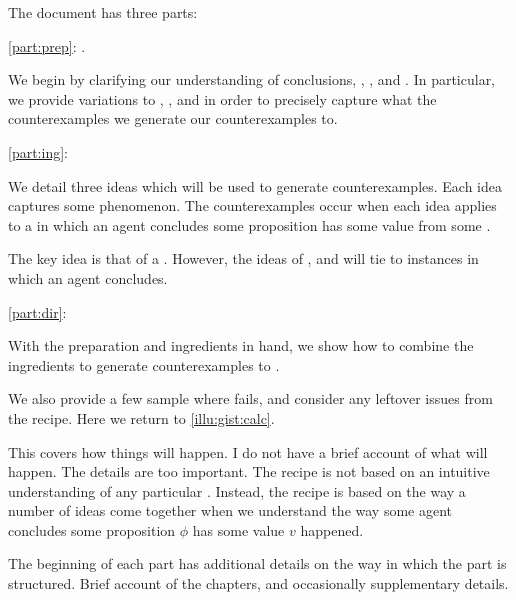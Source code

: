 \begin{note}
  The document has three parts:

  \begin{TOCEnum}
  \item
    \autoref{part:prep}: .

    We begin by clarifying our understanding of conclusions, \qWhy{}, \qHow{}, and \issueInclusion{}.
    In particular, we provide variations to \qWhy{}, \qHow{}, and \issueInclusion{} in order to precisely capture what the counterexamples we generate our counterexamples to.
  \item
    \autoref{part:ing}: 

    We detail three ideas which will be used to generate counterexamples.
    Each idea captures some phenomenon.
    The counterexamples occur when each idea applies to a  in which an agent concludes some proposition has some value from some \pool{}.

    The key idea is that of a \fc{}.
    However, the ideas of \tC{}, and \requ{} will tie  to instances in which an agent concludes.
  \item
    \autoref{part:dir}: 

    With the preparation and ingredients in hand, we show how to combine the ingredients to generate counterexamples to \issueInclusion{}.

    We also provide a few sample  where \issueInclusion{} fails, and consider any leftover issues from the recipe.
    Here we return to \autoref{illu:gist:calc}.
  \end{TOCEnum}

  This covers how things will happen.
  I do not have a brief account of what will happen.
  The details are too important.
  The recipe is not based on an intuitive understanding of any particular \scen{}.
  Instead, the recipe is based on the way a number of ideas come together when we understand the way some agent concludes some proposition \(\phi\) has some value \(v\) happened.

  The beginning of each part has additional details on the way in which the part is structured.
  Brief account of the chapters, and occasionally supplementary details.
\end{note}



